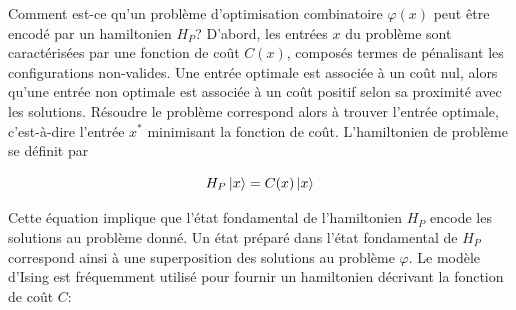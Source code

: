 Comment est-ce qu'un problème d'optimisation combinatoire $\varphi(x)$ peut être encodé par un hamiltonien $H_{P}$? D'abord, les entrées $x$ du problème sont caractérisées par une fonction de coût $C(x)$, composés termes de pénalisant les configurations non-valides. Une entrée optimale est associée à un coût nul, alors qu'une entrée non optimale est associée à un coût positif selon sa proximité avec les solutions. Résoudre le problème correspond alors à trouver l'entrée optimale, c'est-à-dire l'entrée $x^{*}$ minimisant la fonction de coût. L'hamiltonien de problème se définit par

\begin{equation}
    H_{P} \ket{x} = C(x) \ket{x}
\end{equation}

Cette équation implique que l'état fondamental de l'hamiltonien $H_{P}$ encode les solutions au problème donné. Un état préparé dans l'état fondamental de $H_{P}$ correspond ainsi à une superposition des solutions au problème $\varphi$. Le modèle d'Ising est fréquemment utilisé pour fournir un hamiltonien décrivant la fonction de coût $C$:

